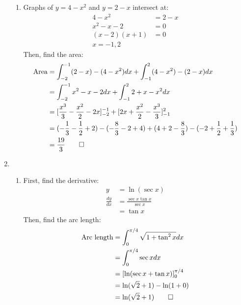 \documentclass[12pt, a4paper]{article}
\begin{document}
\begin{enumerate}[Q\arabic*.]
\begin{enumerate}[(\alph*)]
      \item Graphs of $y=4-x^2$ and $y=2-x$ intersect at: 
        \begin{align*}
          4-x^2 &= 2-x\\
          x^2-x-2 &= 0\\
          (x-2)(x+1) &= 0\\
          x = -1, 2
        \end{align*}
        Then, find the area:
        \begin{align*}
          \text{Area} &= \int^{-1}_{-2} (2-x)-(4-x^2)dx +\int^2_{-1}(4-x^2)-(2-x)dx\\
                      &= \int^{-1}_{-2} x^2-x-2 dx + \int^{2}_{-1} 2 + x -x^2 dx\\
                      &= [\frac{x^3}{3} - \frac{x^2}{2}-2x]^{-1}_{-2} + [2x+\frac{x^2}{2}-\frac{x^3}{3}]^2_{-1}\\
                      &= (-\frac{1}{3} -\frac{1}{2} + 2) - (-\frac{8}{3} -2 + 4) + (4 + 2 -\frac{8}{3}) - (-2 + \frac{1}{2} + \frac{1}{3})\\
                      &= \frac{19}{3} \qed
        \end{align*}
    \end{enumerate}
    \pagebreak

  \item 
    \begin{enumerate}[(\alph*)]
      \item First, find the derivative:
        \begin{align*}
          y &= \ln(\sec x)\\
          \frac{dy}{dx} &= \frac{\sec x \tan x }{\sec x}\\
                        &= \tan x 
        \end{align*}
        Then, find the arc length:
        \begin{align*}
          \text{Arc length} &= \int^{\pi/4}_0 \sqrt{1 + \tan^2x}dx\\
          &= \int^{\pi /4}_0 \sec x dx\\
          &= [\ln(\sec x + \tan x)]^{\pi /4}_0\\
          &= \ln(\sqrt{2} + 1) - \ln(1 + 0)\\
          &= \ln(\sqrt{2} + 1)\qed
        \end{align*}


\end{enumerate}
\end{enumerate}
\end{document}
